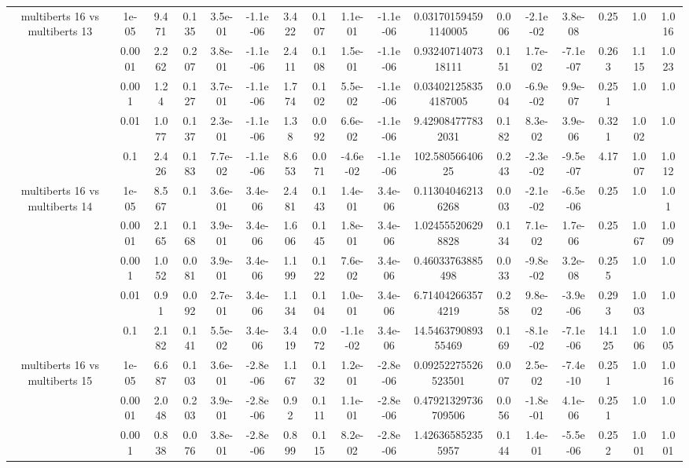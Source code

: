 \begin{tabular}{|c|c|c|c|c|c|c|c|c|c|c|c|c|c|c|c|c|}
\hline
\multirow{5}{*}{multiberts 16 vs multiberts 13} & 1e-05 & 9.471 & 0.135 & 3.5e-01 & -1.1e-06 & 3.422 & 0.107 & 1.1e-01 & -1.1e-06 & 0.031701594591140005 & 0.006 & -2.1e-02 & 3.8e-08 & 0.25 & 1.0 & 1.016 \\
 & 0.0001 & 2.262 & 0.207 & 3.8e-01 & -1.1e-06 & 2.411 & 0.108 & 1.5e-01 & -1.1e-06 & 0.9324071407318111 & 0.151 & 1.7e-02 & -7.1e-07 & 0.263 & 1.115 & 1.023 \\
 & 0.001 & 1.24 & 0.127 & 3.7e-01 & -1.1e-06 & 1.774 & 0.102 & 5.5e-02 & -1.1e-06 & 0.034021258354187005 & 0.004 & -6.9e-02 & 9.9e-07 & 0.251 & 1.0 & 1.0 \\
 & 0.01 & 1.077 & 0.137 & 2.3e-01 & -1.1e-06 & 1.38 & 0.092 & 6.6e-02 & -1.1e-06 & 9.429084777832031 & 0.182 & 8.3e-02 & 3.9e-06 & 0.321 & 1.002 & 1.0 \\
 & 0.1 & 2.426 & 0.183 & 7.7e-02 & -1.1e-06 & 8.653 & 0.071 & -4.6e-02 & -1.1e-06 & 102.58056640625 & 0.243 & -2.3e-02 & -9.5e-07 & 4.17 & 1.007 & 1.012 \\
\hline
\multirow{5}{*}{multiberts 16 vs multiberts 14} & 1e-05 & 8.567 & 0.1 & 3.6e-01 & 3.4e-06 & 2.481 & 0.143 & 1.4e-01 & 3.4e-06 & 0.113040462136268 & 0.003 & -2.1e-02 & -6.5e-06 & 0.25 & 1.0 & 1.01 \\
 & 0.0001 & 2.165 & 0.168 & 3.9e-01 & 3.4e-06 & 1.606 & 0.145 & 1.8e-01 & 3.4e-06 & 1.024555206298828 & 0.134 & 7.1e-02 & 1.7e-06 & 0.25 & 1.067 & 1.009 \\
 & 0.001 & 1.052 & 0.081 & 3.9e-01 & 3.4e-06 & 1.199 & 0.122 & 7.6e-02 & 3.4e-06 & 0.46033763885498 & 0.033 & -9.8e-02 & 3.2e-08 & 0.255 & 1.0 & 1.0 \\
 & 0.01 & 0.91 & 0.092 & 2.7e-01 & 3.4e-06 & 1.134 & 0.104 & 1.0e-01 & 3.4e-06 & 6.714042663574219 & 0.258 & 9.8e-02 & -3.9e-06 & 0.293 & 1.003 & 1.0 \\
 & 0.1 & 2.182 & 0.141 & 5.5e-02 & 3.4e-06 & 3.419 & 0.072 & -1.1e-02 & 3.4e-06 & 14.546379089355469 & 0.169 & -8.1e-02 & -7.1e-06 & 14.125 & 1.006 & 1.005 \\
\hline
\multirow{5}{*}{multiberts 16 vs multiberts 15} & 1e-05 & 6.687 & 0.103 & 3.6e-01 & -2.8e-06 & 1.167 & 0.132 & 1.2e-01 & -2.8e-06 & 0.09252275526523501 & 0.007 & 2.5e-02 & -7.4e-10 & 0.251 & 1.0 & 1.016 \\
 & 0.0001 & 2.048 & 0.203 & 3.9e-01 & -2.8e-06 & 0.92 & 0.111 & 1.1e-01 & -2.8e-06 & 0.47921329736709506 & 0.056 & -1.8e-01 & 4.1e-06 & 0.251 & 1.0 & 1.0 \\
 & 0.001 & 0.838 & 0.076 & 3.8e-01 & -2.8e-06 & 0.899 & 0.115 & 8.2e-02 & -2.8e-06 & 1.426365852355957 & 0.144 & 1.4e-01 & -5.5e-06 & 0.252 & 1.001 & 1.001 \\

\end{tabular}
